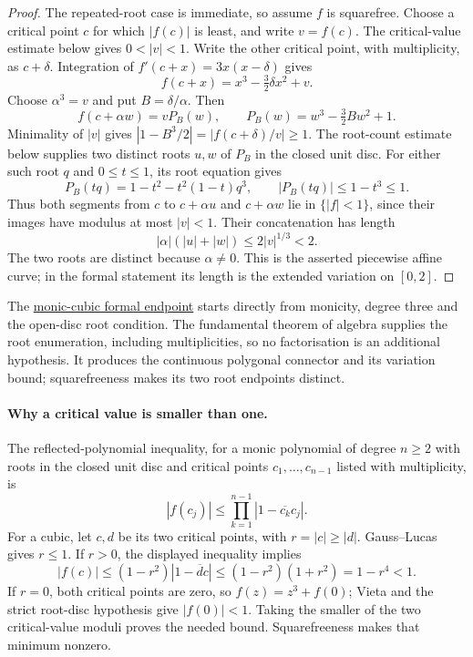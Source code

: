 \documentclass[11pt]{article}
\begin{document}
\begin{proof}
The repeated-root case is immediate, so assume $f$ is squarefree.  Choose a
critical point $c$ for which $|f(c)|$ is least, and write $v=f(c)$.
The critical-value estimate below gives $0<|v|<1$.  Write the other critical
point, with multiplicity, as $c+\delta$.  Integration of
$f'(c+x)=3x(x-\delta)$ gives
\[
 f(c+x)=x^3-\tfrac32\delta x^2+v.
\]
Choose $\alpha^3=v$ and put $B=\delta/\alpha$.  Then
\[
 f(c+\alpha w)=vP_B(w),\qquad
 P_B(w)=w^3-\tfrac32Bw^2+1.
\]
Minimality of $|v|$ gives
$|1-B^3/2|=|f(c+\delta)/v|\ge1$.  The root-count estimate below supplies
two distinct roots $u,w$ of $P_B$ in the closed unit disc.
For either such root $q$ and $0\le t\le1$, its root equation gives
\[
 P_B(tq)=1-t^2-t^2(1-t)q^3,\qquad
 |P_B(tq)|\le1-t^3\le1.
\]
Thus both segments from $c$ to $c+\alpha u$ and $c+\alpha w$ lie in
$\{|f|<1\}$, since their images have modulus at most $|v|<1$.
Their concatenation has length
\[
 |\alpha|(|u|+|w|)\le2|v|^{1/3}<2.
\]
The two roots are distinct because $\alpha\ne0$.  This is the asserted
piecewise affine curve; in the formal statement its length is the extended
variation on $[0,2]$.
\end{proof}

The \href{https://github.com/wcook04/plectis-erdos/blob/3be82b1a7340284aea72e9a5c8493cb020843921/ErdosProblems/Erdos1041/PaperCubicMonic.lean#L32}{monic-cubic formal endpoint} starts directly from
monicity, degree three and the open-disc root condition.  The fundamental
theorem of algebra supplies the root enumeration, including multiplicities,
so no factorisation is an additional hypothesis.  It produces the continuous
polygonal connector and its variation bound; squarefreeness makes its two
root endpoints distinct.

\paragraph{Why a critical value is smaller than one.}
The reflected-polynomial inequality, for a monic polynomial of degree $n\ge2$
with roots in the closed unit disc and critical points $c_1,\ldots,c_{n-1}$
listed with multiplicity, is
\[
 |f(c_j)|\le\prod_{k=1}^{n-1}|1-\overline{c_k}c_j|.
\]
For a cubic, let $c,d$ be its two critical points, with
$r=|c|\ge|d|$.  Gauss--Lucas gives $r\le1$.  If $r>0$, the displayed
inequality implies
\[
 |f(c)|\le(1-r^2)|1-\overline d c|
 \le(1-r^2)(1+r^2)=1-r^4<1.
\]
If $r=0$, both critical points are zero, so $f(z)=z^3+f(0)$;
Vieta and the strict root-disc hypothesis give $|f(0)|<1$.
Taking the smaller of the two critical-value moduli proves the needed
bound.  Squarefreeness makes that minimum nonzero.
\end{document}

